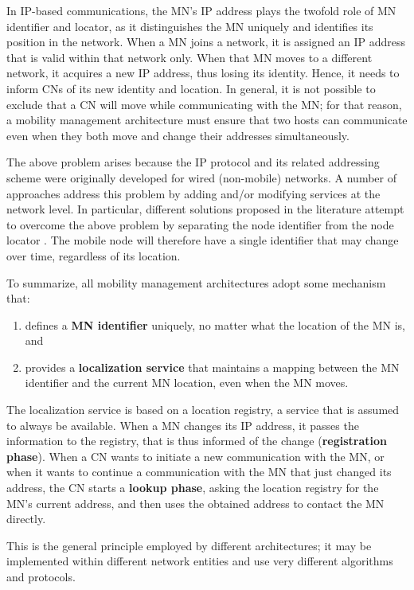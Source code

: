 \documentclass[preprint,12pt]{elsarticle}
\begin{document}
In IP-based communications, the MN’s IP address plays the twofold role of MN 
identifier and locator, as it distinguishes the MN uniquely and identifies 
its position in the network. 
When a MN joins a network, it is assigned an IP 
address that is valid within that network only. When that MN moves to a 
different network, it acquires a new IP address, thus losing its identity. 
Hence, it needs to inform CNs of its new identity and location. In general, it 
is not possible to exclude that a CN will move while communicating with the 
MN; for that reason, a mobility management architecture must ensure that two hosts can 
communicate even when they both move and change their addresses simultaneously.

The above problem arises because the IP protocol and its related addressing scheme 
were originally developed for wired (non-mobile) networks. A number of approaches address this problem by adding and/or modifying services at the network level.
In particular, different solutions proposed in the literature attempt to overcome 
the above problem by separating the node identifier from the node locator 
\cite{lisp,Pan:2010,Atkinson:2010,Gladisch:2014,Ramirez:2014,rfc5533,Tuncer:2013}.
The mobile node will therefore have a single identifier that may change over time, regardless of its location. 

To summarize, all mobility management architectures adopt some mechanism 
that: 
\begin{enumerate}
 \item defines a \textbf{MN identifier} uniquely, no matter what the location 
of the MN is, and 
 \item provides a \textbf{localization service} that maintains a mapping 
between the MN identifier and the current MN location, even when the MN moves. 
\end{enumerate}
The localization service is based on a location registry, a service that is 
assumed to always be available. When a MN changes its IP address, it 
passes the information to the registry, that is thus informed of the change
(\textbf{registration phase}). 
When a CN wants to initiate a new communication with the MN, or when it wants 
to continue a communication with the MN that just changed its address, the CN 
starts a \textbf{lookup phase}, asking the location registry for the MN’s 
current address, and then uses the obtained address to contact the MN directly. 

This is the general principle employed by different architectures; it may be 
implemented within different network entities and use very different 
algorithms and protocols. 
\end{document}
